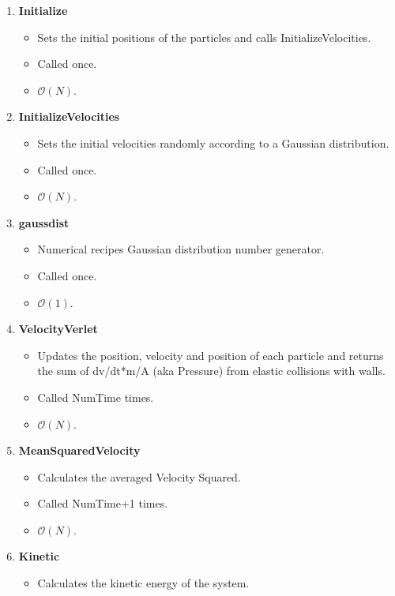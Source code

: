 \documentclass[conference]{IEEEtran}
\begin{document}
\begin{enumerate}
    \item \textbf{Initialize}
    \begin{itemize}
        \item Sets the initial positions of the particles and calls InitializeVelocities.
        \item Called once.
        \item $\mathcal{O}(N)$.
    \end{itemize}
    \item \textbf{InitializeVelocities}
    \begin{itemize}
        \item Sets the initial velocities randomly according to a Gaussian distribution.
        \item Called once.
        \item $\mathcal{O}(N)$.
    \end{itemize}
    \item \textbf{gaussdist}
    \begin{itemize}
        \item Numerical recipes Gaussian distribution number generator.
        \item Called once.
        \item $\mathcal{O}(1)$.
    \end{itemize}
    \item \textbf{VelocityVerlet}
    \begin{itemize}
        \item Updates the position, velocity and position of each particle and returns the sum of dv/dt*m/A (aka Pressure) from elastic collisions with walls.
        \item Called NumTime times.
        \item $\mathcal{O}(N)$.
    \end{itemize}
    \item \textbf{MeanSquaredVelocity}
    \begin{itemize}
        \item Calculates the averaged Velocity Squared.
        \item Called NumTime+1 times.
        \item $\mathcal{O}(N)$.
    \end{itemize}
    \item \textbf{Kinetic}
    \begin{itemize}
        \item Calculates the kinetic energy of the system.

\end{itemize}
\end{enumerate}
\end{document}
